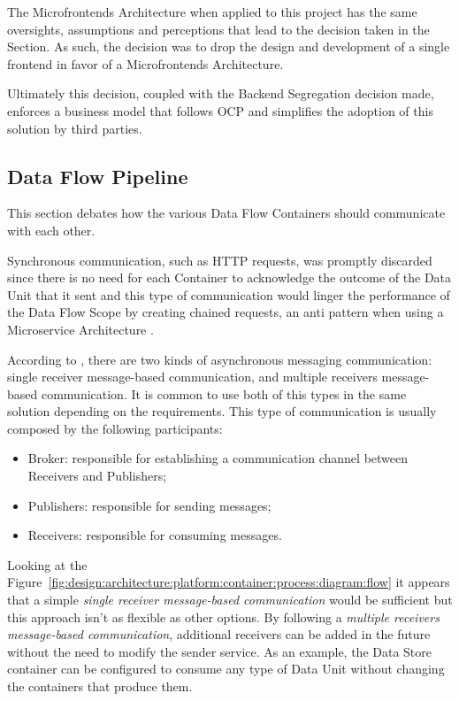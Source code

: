 The Microfrontends Architecture when applied to this project has the same oversights, assumptions and perceptions that lead to the decision taken in the  Section. As such, the decision was to drop the design and development of a single frontend in favor of a Microfrontends Architecture.

Ultimately this decision, coupled with the Backend Segregation decision made, enforces a business model that follows \gls{OCP} and simplifies the adoption of this solution by third parties.

\subsection{Data Flow Pipeline}
\label{subsec:design:alternatives:flow}

This section debates how the various Data Flow Containers should communicate with each other.

Synchronous communication, such as HTTP requests, was promptly discarded since there is no need for each Container to acknowledge the outcome of the Data Unit that it sent and this type of communication would linger the performance of the Data Flow Scope by creating chained requests, an anti pattern when using a Microservice Architecture \parencite{microsoftmicroanti}.

According to \cite{microsoftasync}, there are two kinds of asynchronous messaging communication: single receiver message-based communication, and multiple receivers message-based communication. It is common to use both of this types in the same solution depending on the requirements. This type of communication is usually composed by the following participants:

\begin{itemize}
   \item Broker: responsible for establishing a communication channel between Receivers and Publishers;
   \item Publishers: responsible for sending messages;
   \item Receivers: responsible for consuming messages.
\end{itemize}

Looking at the Figure~\ref{fig:design:architecture:platform:container:process:diagram:flow} it appears that a simple \textit{single receiver message-based communication} would be sufficient but this approach isn't as flexible as other options. By following a \textit{multiple receivers message-based communication}, additional receivers can be added in the future without the need to modify the sender service. As an example, the Data Store container can be configured to consume any type of Data Unit without changing the containers that produce them.


